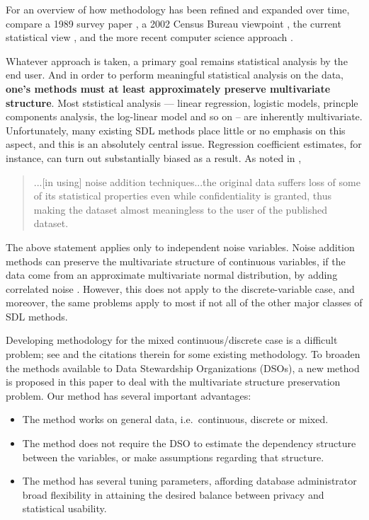 \documentclass[11pt]{article}
\begin{document}
For an overview of how methodology has been refined and expanded over
time, compare a 1989 survey paper \cite{adam}, a 2002 Census Bureau
viewpoint \cite{census2002}, the current statistical view \cite{duncan},
and the more recent computer science approach \cite{dwork}.

Whatever approach is taken, a primary goal remains statistical
analysis by the end user.  And in order to perform meaningful
statistical analysis on the data, {\bf one's methods must at least
approximately preserve multivariate structure}.  Most ststistical
analysis --- linear regression, logistic models, princple components
analysis, the log-linear model and so on -- are inherently multivariate.
Unfortunately, many existing SDL methods place little or no emphasis
on this aspect, and this is an absolutely central issue.  
Regression coefficient estimates, for instance, can turn out
substantially biased as a result.  As noted in \cite{nivule},

\begin{quote}
...[in using] noise addition techniques...the original data
suffers loss of some of its statistical properties even while
confidentiality is granted, thus making the dataset almost meaningless
to the user of the published dataset. 
\end{quote}

The above statement applies only to independent noise variables. Noise
addition methods can preserve the multivariate structure of continuous
variables, if the data come from an approximate multivariate normal
distribution, by adding correlated noise \cite{matloff1986}
\cite{kim} \cite{tendick}.  However, this does not apply to the
discrete-variable case, and moreover, the same problems apply to most if
not all of the other major classes of SDL methods.

Developing methodology for the mixed continuous/discrete case is a
difficult problem; see \cite{manrique} and the citations therein for
some existing methodology.  To broaden the methods available to Data
Stewardship Organizations (DSOs), a new method is proposed in this paper
to deal with the multivariate structure preservation problem. Our method
has several important advantages:

\begin{itemize}

\item The method works on general data, i.e.\ continuous, discrete or
mixed. 

\item The method does not require the DSO to estimate the dependency
structure between the variables, or make assumptions regarding that
structure.

\item The method has several tuning parameters, affording database
administrator broad flexibility in attaining the desired balance between
privacy and statistical usability.

\end{itemize}
\end{document}
